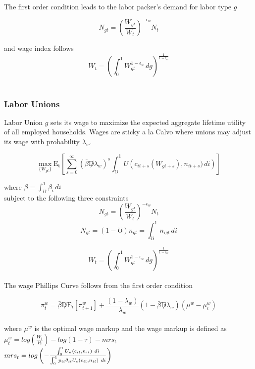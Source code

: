 \documentclass[titlepage]{\econtex}\providecommand{\texname}{BufferStockTheory}
\begin{document}
The first order condition leads to the labor packer's demand for labor type $g$

$$ N_{gt} = \left(\frac{W_{gt}}{W_{t}}\right)^{-\epsilon_{w}} N_{t} $$

and wage index follows
$$ W_{t} = \left(\int_{0}^{1} W_{gt}^{1-\epsilon_{w}}\,dg\right)^{\frac{1}{1-\epsilon_{w}}}$$ \\




\hypertarget{Labor Unions}{}
\subsubsection{Labor Unions}

Labor Union $g$  sets its wage to maximize the expected aggregate lifetime utility of all employed households. Wages are sticky a la Calvo where unions may adjust its wage with probability $\lambda_{w}$. 

$$ \max_{\{W_{gt}\}} \mathrm{E_{t}}\left[\sum_{s=0}^{\infty} (\bar{\beta} \not D \lambda_{w})^{s} \int_{\mho}^{1}  U\left (c_{it+s}(W_{gt+s}), n_{i t+s}) \, di \right)\right] $$

where $\bar{\beta} = \int_{\mho}^{1} \beta_{i} \, di$ \\

subject to the following three constraints $$ N_{gt} = \left(\frac{W_{gt}}{W_{t}}\right)^{-\epsilon_{w}} N_{t} $$
$$  N_{gt} = (1-\mho) \mathit{n}_{gt} = \int_{\mho}^{1} n_{igt}\,di $$ 

$$ W_{t} = \left(\int_{0}^{1} W_{gt}^{1-\epsilon_{w}}\,dg\right)^{\frac{1}{1-\epsilon_{w}}}$$ \\



The wage Phillips Curve follows from the first order condition


$$ \pi_{t}^{w} =   \bar{\beta} \not D  \mathrm{E}_{t} \left[ \pi_{t+1}^{w}\right] + \frac{(1-\lambda_{w})}{\lambda_{w}} (1- \bar{\beta} \not D \lambda_{w}) (\mu^{w} - \mu_{t}^{w})$$ \\

where $\mu^{w}$ is the optimal wage markup and the wage markup is defined as \\ 

$\mu_{t}^{w} = log\left( \frac{W_{t}}{P_{t}}\right)  - log\left(1 -\tau \right) - mrs_{t}$ \\


$ mrs_{t} = log \left(- \frac{\int_{0}^{1}   U_{n} \left(c_{i t}, n_{i t} \right) \ d i  }{\int_{0}^{1}  p_{it} \theta_{it} U_{c} \left(c_{i t}, n_{i t} \right) \  di } \right) \\ \\ $
\end{document}

